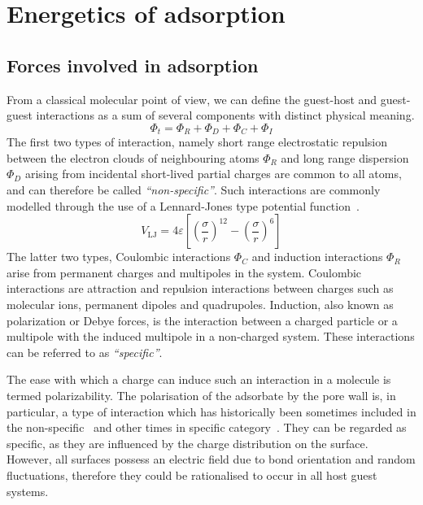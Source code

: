 
\section{Energetics of adsorption}

\subsection{Forces involved in adsorption}\label{calo:forces}

From a classical molecular point of view, we can define the
guest-host and guest-guest interactions as a sum of several
components with distinct physical meaning.
%
\begin{equation}\label{calo:eqn:interactions}
	\Phi_t = \Phi_{R} + \Phi_{D} + \Phi_{C} + \Phi_{I}
\end{equation}
%
The first two types of interaction, namely short range
electrostatic repulsion between the electron clouds of
neighbouring atoms \(\Phi_{R}\) and long range 
dispersion \(\Phi_{D}\) arising from
incidental short-lived partial charges are common to all
atoms, and can therefore be called \textit{``non-specific''}. Such
interactions are commonly modelled through the use of a
Lennard-Jones type potential 
function~\cite{jonesDeterminationMolecularFields1924}.
%
\begin{equation}\label{calo:eqn:lennard-jones}
	V_\text{LJ} = 4\varepsilon \left[ \left(\frac{\sigma}{r}\right)^{12} - \left(\frac{\sigma}{r}\right)^6 \right]
\end{equation}
%
The latter two types, Coulombic interactions \(\Phi_{C}\) and induction
interactions \(\Phi_{R}\) arise from permanent charges and multipoles in the
system. Coulombic interactions are attraction and repulsion
interactions between charges such as molecular ions, permanent
dipoles and quadrupoles.
Induction, also known as polarization or Debye forces, is the interaction
between a charged particle or a multipole with the induced multipole
in a non-charged system. These interactions can be referred to as
\textit{``specific''}. 

The ease with which a charge can induce such an interaction in a
molecule is termed polarizability. The polarisation of the adsorbate
by the pore wall is, in particular, a type of interaction which has 
historically been sometimes included in the 
non-specific~\cite{barrerZeolitesClayMinerals1978} and other
times in specific 
category~\cite{coudertComputationalCharacterizationPrediction2016}. 
They can be regarded as specific, as they 
are influenced by the charge distribution on the surface. However,
all surfaces possess an electric field due to bond orientation and
random fluctuations, therefore they could be rationalised to occur
in all host guest systems.

